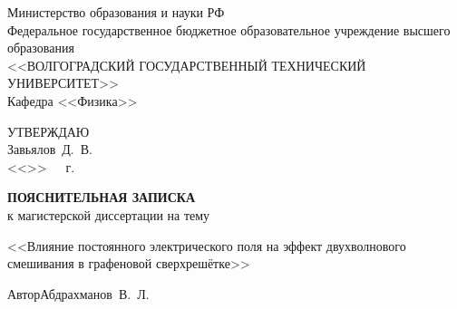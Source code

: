 \begin{titlepage}
    \begin{center}
       Министерство образования и науки РФ\\
    Федеральное государственное бюджетное образовательное учреждение высшего образования\\
    <<ВОЛГОГРАДСКИЙ ГОСУДАРСТВЕННЫЙ ТЕХНИЧЕСКИЙ УНИВЕРСИТЕТ>>\\
        \vspace{.5cm}
        Кафедра <<Физика>>
    \end{center}
    \vspace{1cm}
    \begin{flushright}
        \newsavebox\tmp
        \sbox{}%
        \begin{minipage}{\wd\tmp}
        \begin{center}
        УТВЕРЖДАЮ\\
        \vspace{.3cm}
        \box\tmp
        \vspace{.3cm}
        \hrulefill\hspace{1em}Завьялов~Д.~В.\\
        \vspace{.3cm}
        <<\underline{\hspace{.5cm}}>>~\underline{\hspace{3cm}}~\the\year~г.
        \end{center}
        \end{minipage}
    \end{flushright}
    \vspace{2cm}
    \begin{center}
        \Large \textbf{ПОЯСНИТЕЛЬНАЯ ЗАПИСКА} \\
        \large к магистерской диссертации на тему
    \end{center}
    \vspace{1cm}
    \begin{center}
        <<Влияние постоянного электрического поля на эффект двухволнового смешивания в графеновой сверхрешётке>>
    \end{center}
    \vspace{2cm}
    \begin{flushleft}
        Автор\hspace{2.5cm}\underline{\hspace{5cm}}\hspace{1cm}Абдрахманов~В.~Л.\\
        \vspace{.5cm}

\end{flushleft}
\end{titlepage}
